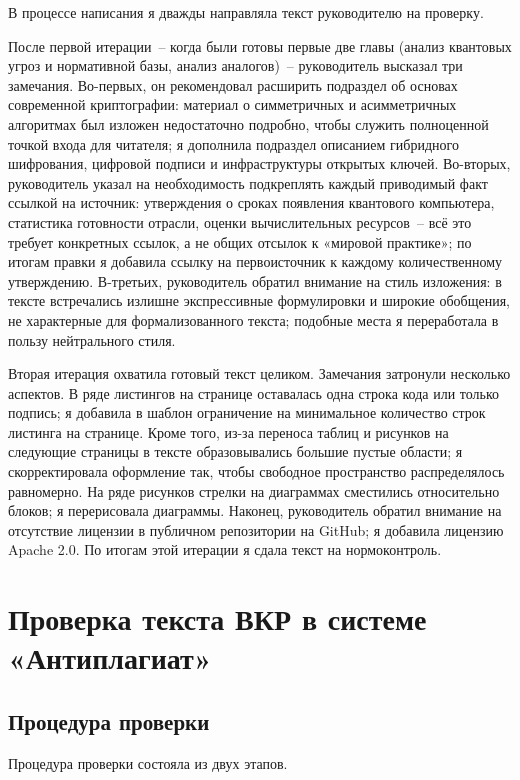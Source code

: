 \documentclass{itmo-vkr}
\begin{document}
В процессе написания я дважды направляла текст руководителю на проверку.

После первой итерации~-- когда были готовы первые две главы (анализ квантовых угроз и нормативной базы, анализ аналогов)~-- руководитель высказал три замечания. Во-первых, он рекомендовал расширить подраздел об основах современной криптографии: материал о симметричных и асимметричных алгоритмах был изложен недостаточно подробно, чтобы служить полноценной точкой входа для читателя; я дополнила подраздел описанием гибридного шифрования, цифровой подписи и инфраструктуры открытых ключей. Во-вторых, руководитель указал на необходимость подкреплять каждый приводимый факт ссылкой на источник: утверждения о сроках появления квантового компьютера, статистика готовности отрасли, оценки вычислительных ресурсов~-- всё это требует конкретных ссылок, а не общих отсылок к «мировой практике»; по итогам правки я добавила ссылку на первоисточник к каждому количественному утверждению. В-третьих, руководитель обратил внимание на стиль изложения: в тексте встречались излишне экспрессивные формулировки и широкие обобщения, не характерные для формализованного текста; подобные места я переработала в пользу нейтрального стиля.

Вторая итерация охватила готовый текст целиком. Замечания затронули несколько аспектов. В ряде листингов на странице оставалась одна строка кода или только подпись; я добавила в шаблон ограничение на минимальное количество строк листинга на странице. Кроме того, из-за переноса таблиц и рисунков на следующие страницы в тексте образовывались большие пустые области; я скорректировала оформление так, чтобы свободное пространство распределялось равномерно. На ряде рисунков стрелки на диаграммах сместились относительно блоков; я перерисовала диаграммы. Наконец, руководитель обратил внимание на отсутствие лицензии в публичном репозитории на GitHub; я добавила лицензию Apache 2.0. По итогам этой итерации я сдала текст на нормоконтроль.

\newpage

\section{Проверка текста ВКР в системе «Антиплагиат»}

\subsection{Процедура проверки}

Процедура проверки состояла из двух этапов.
\end{document}
